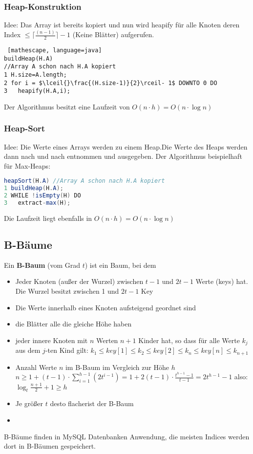 \documentclass[jou,apacite]{apa6}
\begin{document}
\subsubsection{Heap-Konstruktion}
Idee: Das Array ist bereits kopiert und nun wird heapify für alle Knoten deren Index $\leq \lceil{}\frac{(n-1)}{2}\rceil-1$ (Keine Blätter) aufgerufen.
\begin{lstlisting} [mathescape, language=java]
buildHeap(H.A) 
//Array A schon nach H.A kopiert
1 H.size=A.length;
2 for i = $\lceil{}\frac{(H.size-1)}{2}\rceil- 1$ DOWNTO 0 DO
3   heapify(H.A,i);
\end{lstlisting}
Der Algorithmus besitzt eine Laufzeit von $O(n \cdot h) = O(n \cdot \log n)$
\subsubsection{Heap-Sort}
Idee: Die Werte eines Arrays werden zu einem Heap.Die Werte des Heaps werden dann nach und nach entnommen und ausgegeben.
Der Algorithmus beispielhaft für Max-Heaps:
\begin{lstlisting}[language=java]
heapSort(H.A) //Array A schon nach H.A kopiert
1 buildHeap(H.A);
2 WHILE !isEmpty(H) DO 
3   extract-max(H);
\end{lstlisting}
Die Laufzeit liegt ebenfalls in $O(n\cdot h)= O(n\cdot\log n)$

\subsection{B-Bäume}
Ein {\bfseries B-Baum} (vom Grad $t$) ist ein Baum, bei dem
\begin{itemize}
    \item Jeder Knoten (außer der Wurzel) zwischen $t-1$ und $2t-1$ Werte (keys) hat. Die Wurzel besitzt zwischen 1 und $2t-1$ Key
    \item Die Werte innerhalb eines Knoten aufsteigend geordnet sind
    \item die Blätter alle die gleiche Höhe haben
    \item jeder innere Knoten mit $n$ Werten $n+1$ Kinder hat, so dass für alle Werte $k_j$ aus dem $j$-ten Kind gilt: $k_1 \leq key[1] \leq k_2 \leq key[2] \leq k_n \leq key[n] \leq k_{n+1}$
    \item Anzahl Werte $n$ im B-Baum im Vergleich zur Höhe $h$ $n \geq 1 + (t-1) \cdot \sum_{i=1}^{h-1}(2t^{i-1}) = 1+ 2(t-1)\cdot \frac{t^{h-1}-1}{t-1} = 2t^{h-1}-1$ also: $\log_{t}\frac{n+1}{2} + 1 \geq h$
    \item Je größer $t$ desto \dq flacher\dq ist der B-Baum
    \item 
\end{itemize}
B-Bäume finden in MySQL Datenbanken Anwendung, die meisten Indices werden dort in B-Bäumen gespeichert.
\end{document}

